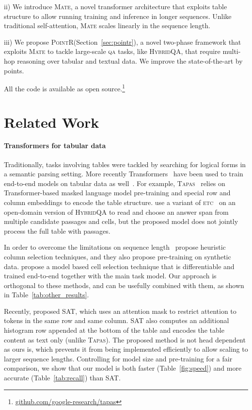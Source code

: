\documentclass[11pt]{article}
\newcommand{\abr}[1]{\textsc{#1}}
\newcommand{\qa}[0]{\abr{qa}}
\newcommand\hqa{\textsc{HybridQA}\xspace}
\newcommand{\pointr}{\textsc{PointR}\xspace}
\newcommand{\etc}{\textsc{etc}\xspace}
\newcommand{\tapas}{\textsc{Tapas}\xspace}
\newcommand{\sat}{\textsc{SAT}\xspace}
\newcommand{\model}{\textsc{Mate}\xspace}
\begin{document}
ii) We introduce \model, a novel transformer architecture that exploits table structure to allow running training and inference in longer sequences. Unlike traditional self-attention, \model scales linearly in the sequence length.

iii) We propose \pointr (Section~\ref{sec:pointr}), a novel two-phase framework that exploits \model to tackle large-scale \qa{} tasks, like \hqa, that require multi-hop reasoning over tabular and textual data. We improve the state-of-the-art by  points.

All the code is available as open source.\footnote{\href{https://github.com/google-research/tapas}{github.com/google-research/tapas}}
 \section{Related Work}
\label{sec:related}


\paragraph{Transformers for tabular data}
Traditionally, tasks involving tables were tackled  by searching for logical forms
in a semantic parsing setting. More recently Transformers~\cite{vaswani17} have been used
to train end-to-end models on tabular data as well~\cite{Chen2020TabFact}.
For example, \tapas~\cite{herzig-etal-2020-tapas} relies on Transformer-based masked language model pre-training and special row and column embeddings
to encode the table structure. \citet{chen2021open} 
use a variant of \etc ~\cite{ainslie-etal-2020-etc} 
on an open-domain version of \hqa
to read and choose an answer span from multiple candidate passages and cells, but the proposed model does not jointly process the full table with passages.

In order to overcome the limitations on sequence length~\citet{eisenschlos-etal-2020-understanding}
propose heuristic column selection techniques, and they also propose pre-training on synthetic data. 
\citet{krichene-etal-2021-dot} propose a model based cell selection technique that is differentiable and trained end-to-end together with the main task model.
Our approach is
orthogonal to these methods, and can be usefully combined with them, as shown in Table~\ref{tab:other_results}.

Recently, \citet{zhang-etal-2020-table}  proposed \sat, which uses an attention mask
to restrict attention to tokens in the same
row and same column. \sat also computes an additional histogram row appended at the bottom of the table and encodes the table content as text only (unlike \tapas). The proposed method is not head dependent
as ours is, which prevents it from being implemented efficiently to allow scaling to larger
sequence lengths. Controlling for model size and pre-training for a fair comparison, we show that our model is both faster (Table~\ref{fig:speed}) and more accurate (Table~\ref{tab:recall}) than \sat.
\end{document}
